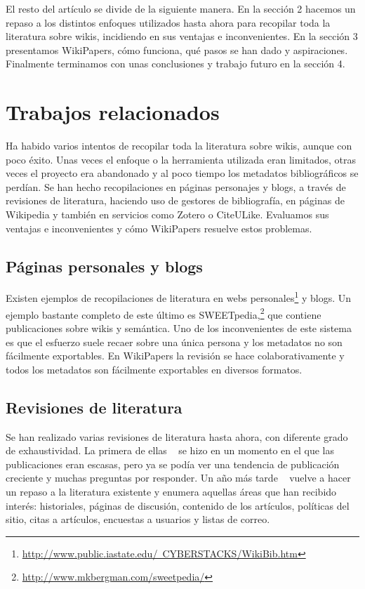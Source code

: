 \documentclass[11pt,twocolumn]{article}
\begin{document}
El resto del artículo se divide de la siguiente manera. En la sección 2 hacemos un repaso a los distintos enfoques utilizados hasta ahora para recopilar toda la literatura sobre wikis, incidiendo en sus ventajas e inconvenientes. En la sección 3 presentamos WikiPapers, cómo funciona, qué pasos se han dado y aspiraciones. Finalmente terminamos con unas conclusiones y trabajo futuro en la sección 4.

\section{Trabajos relacionados}
Ha habido varios intentos de recopilar toda la literatura sobre wikis, aunque con poco éxito. Unas veces el enfoque o la herramienta utilizada eran limitados, otras veces el proyecto era abandonado y al poco tiempo los metadatos bibliográficos se perdían. Se han hecho recopilaciones en páginas personajes y blogs, a través de revisiones de literatura, haciendo uso de gestores de bibliografía, en páginas de Wikipedia y también en servicios como Zotero o CiteULike. Evaluamos sus ventajas e inconvenientes y cómo WikiPapers resuelve estos problemas.

\subsection{Páginas personales y blogs}
Existen ejemplos de recopilaciones de literatura en webs personales\footnote{\href{http://www.public.iastate.edu/~CYBERSTACKS/WikiBib.htm}{http://www.public.iastate.edu/~CYBERSTACKS/WikiBib.htm}} y blogs. Un ejemplo bastante completo de este último es SWEETpedia,\footnote{\href{http://www.mkbergman.com/sweetpedia/}{http://www.mkbergman.com/sweetpedia/}} que contiene publicaciones sobre wikis y semántica. Uno de los inconvenientes de este sistema es que el esfuerzo suele recaer sobre una única persona y los metadatos no son fácilmente exportables. En WikiPapers la revisión se hace colaborativamente y todos los metadatos son fácilmente exportables en diversos formatos.

\subsection{Revisiones de literatura}
Se han realizado varias revisiones de literatura hasta ahora, con diferente grado de exhaustividad. La primera de ellas ~\citep{voss2005} se hizo en un momento en el que las publicaciones eran escasas, pero ya se podía ver una tendencia de publicación creciente y muchas preguntas por responder. Un año más tarde ~\citep{ayers2006} vuelve a hacer un repaso a la literatura existente y enumera aquellas áreas que han recibido interés: historiales, páginas de discusión, contenido de los artículos, políticas del sitio, citas a artículos, encuestas a usuarios y listas de correo.
\end{document}
